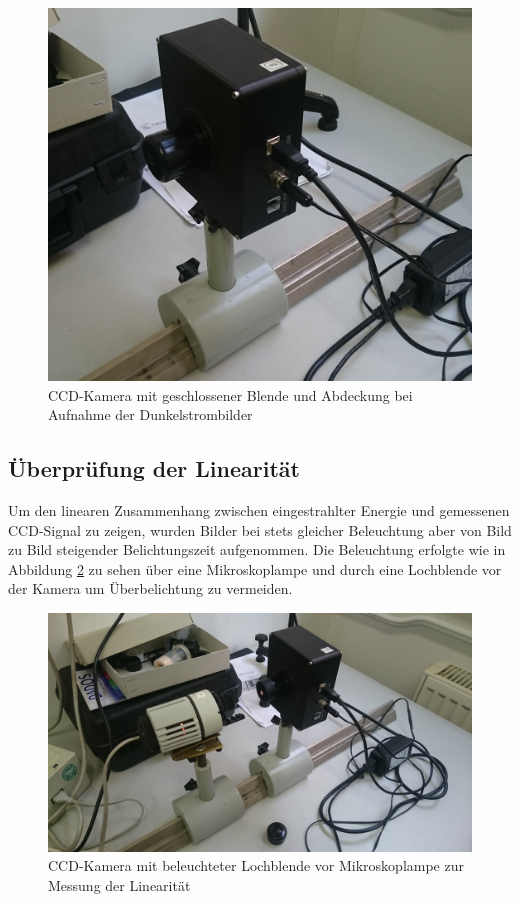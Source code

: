 		\begin{figure}
			\center
			\includegraphics[scale=0.085]{messwerte/ccd-sensor-1.jpg}
			\caption{CCD-Kamera mit geschlossener Blende und Abdeckung bei Aufnahme der Dunkelstrombilder}
			\label{ccd_solo}
		\end{figure}


	\subsection{Überprüfung der Linearität} %
	\label{sub:_berpr_fung_der_linearit_t}
	
		Um den linearen Zusammenhang zwischen eingestrahlter Energie und gemessenen CCD-Signal zu zeigen, wurden Bilder bei stets gleicher Beleuchtung aber von Bild zu Bild steigender Belichtungszeit aufgenommen.
		Die Beleuchtung erfolgte wie in Abbildung \ref{mikrolampe} zu sehen über eine Mikroskoplampe und durch eine Lochblende vor der Kamera um Überbelichtung zu vermeiden.

		\begin{figure}
			\center
			\includegraphics[scale=0.085]{messwerte/Handybilder/DSC_0671.JPG}
			\caption{CCD-Kamera mit beleuchteter Lochblende vor Mikroskoplampe zur Messung der Linearität}
			\label{mikrolampe}
		\end{figure}

